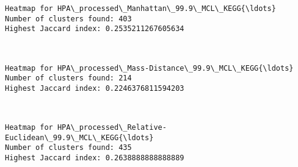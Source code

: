 \documentclass[11pt]{article}
\begin{document}
    \begin{Verbatim}[commandchars=\\\{\}]
Heatmap for HPA\_processed\_Manhattan\_99.9\_MCL\_KEGG{\ldots}
Number of clusters found: 403
Highest Jaccard index: 0.2535211267605634

    \end{Verbatim}

    \begin{center}
    \end{center}
    { \hspace*{\fill} \\}
    
    \begin{Verbatim}[commandchars=\\\{\}]
Heatmap for HPA\_processed\_Mass-Distance\_99.9\_MCL\_KEGG{\ldots}
Number of clusters found: 214
Highest Jaccard index: 0.2246376811594203

    \end{Verbatim}

    \begin{center}
    \end{center}
    { \hspace*{\fill} \\}
    
    \begin{Verbatim}[commandchars=\\\{\}]
Heatmap for HPA\_processed\_Relative-Euclidean\_99.9\_MCL\_KEGG{\ldots}
Number of clusters found: 435
Highest Jaccard index: 0.2638888888888889

    \end{Verbatim}

    \begin{center}
    \end{center}
    { \hspace*{\fill} \\}
    
\end{document}
